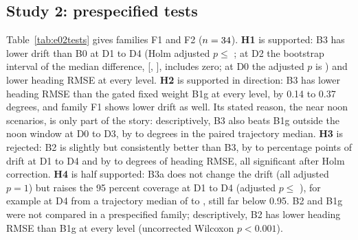 \documentclass[conference]{IEEEtran}
\begin{document}
\subsection{Study 2: prespecified tests}
Table~\ref{tab:e02tests} gives families F1 and F2 ($n=\nnTraj$). \textbf{H1} is supported: B3 has lower drift than B0 at D1 to D4 (Holm adjusted $p \le$ \nFonetwoBzerop{}; at D2 the bootstrap interval of the median difference, [\nFonetwoBzerolo{}, \nFonetwoBzerohi{}], includes zero; at D0 the adjusted $p$ is \nFonezeroBzerop{}) and lower heading RMSE at every level. \textbf{H2} is supported in direction: B3 has lower heading RMSE than the gated fixed weight B1g at every level, by 0.14 to 0.37 degrees, and family F1 shows lower drift as well. Its stated reason, the near noon scenarios, is only part of the story: descriptively, B3 also beats B1g outside the noon window at D0 to D3, by \nowgapMin{} to \nowgapMax{} degrees in the paired trajectory median. \textbf{H3} is rejected: B2 is slightly but consistently better than B3, by \nFoneoneBtwodiff{} to \nFonefourBtwodiff{} percentage points of drift at D1 to D4 and by \nFtwozeroBtwodiff{} to \nFtwofourBtwodiff{} degrees of heading RMSE, all significant after Holm correction. \textbf{H4} is half supported: B3a does not change the drift (all adjusted $p = 1$) but raises the 95 percent coverage at D1 to D4 (adjusted $p \le$ \nFthreefourcoverp{}), for example at D4 from a trajectory median of \nFthreefourcoverB{} to \nFthreefourcoverA{}, still far below 0.95. B2 and B1g were not compared in a prespecified family; descriptively, B2 has lower heading RMSE than B1g at every level (uncorrected Wilcoxon $p < 0.001$).

\begin{table}[t]
\caption{Study 2 prespecified paired tests of B3 against each baseline, trajectory level ($n=\nnTraj$). Diff is B3 minus the baseline (negative favours B3). $\delta$ is the paired dominance delta.}
\label{tab:e02tests}
\centering\footnotesize\setlength{\tabcolsep}{3.5pt}

\end{table}
\end{document}
